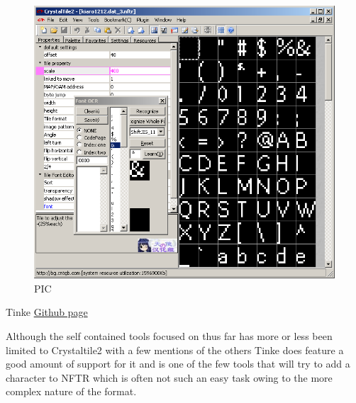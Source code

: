 \documentclass[
]{book}
\begin{document}
\begin{figure}
\centering
\includegraphics{images/114_home_fast6191_romhackingguide_unrenamed_fil___rders_romhackingguidefontnftrcrystaltile2_5.png}
\caption{PIC}
\end{figure}

Tinke \href{https://github.com/pleonex/tinke}{Github page}

Although the self contained tools focused on thus far has more or less been limited to Crystaltile2 with a few mentions of the others Tinke does feature a good amount of support for it and is one of the few tools that will try to add a character to NFTR which is often not such an easy task owing to the more complex nature of the format.
\end{document}
